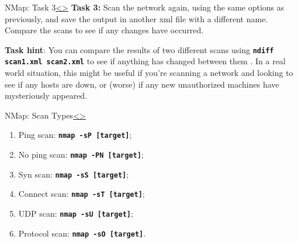\documentclass[12pt]{article}
\newcommand{\code}[1]{\texttt{\bfseries#1}}
\newenvironment{instructionblock}{\Large\bgroup}{\egroup}
\begin{document}
\pagebreak
\begin{slide}{ NMap: Task 3}{\hyperref[slide 7]{\textless}\hyperref[slide 9]{\textgreater}}
   \begin{instructionblock}
    \textbf{Task 3:} Scan the network again, using the same options as previously, and save the output in another xml file with a different name. Compare the scans to see if any changes have occurred.

   \end{instructionblock}
\end{slide}

\textbf{Task hint}: You can compare the results of two different scans using \code{ndiff scan1.xml scan2.xml} to see if anything has changed between them \cite{rtfm}. In a real world situation, this might be useful if you're scanning a network and looking to see if any hosts are down, or (worse) if any new unauthorized machines have mysteriously appeared.\\


\pagebreak
\begin{slide}{ NMap: Scan Types}{\hyperref[slide 8]{\textless}\hyperref[slide 10]{\textgreater}}
\begin{instructionblock}
\begin{enumerate}
\item Ping scan: \code{nmap -sP [target]};
\item No ping scan: \code{nmap -PN [target]};
\item Syn scan: \code{nmap -sS [target]};
\item Connect scan: \code{nmap -sT [target]};
\item UDP scan: \code{nmap -sU [target]};
\item Protocol scan: \code{nmap -sO [target]}.
\end{enumerate}
\end{instructionblock}
\end{slide}
\end{document}
